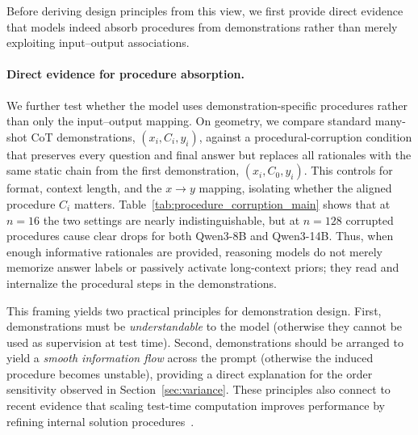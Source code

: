 \documentclass{llmxive}
\begin{document}
Before deriving design principles from this view, we first provide direct evidence that models indeed absorb procedures from demonstrations rather than merely exploiting input--output associations.

\paragraph{Direct evidence for procedure absorption.}
We further test whether the model uses demonstration-specific procedures rather than only the input--output mapping.
On geometry, we compare standard many-shot CoT demonstrations, $(x_i,C_i,y_i)$, against a procedural-corruption condition that preserves every question and final answer but replaces all rationales with the same static chain from the first demonstration, $(x_i,C_0,y_i)$.
This controls for format, context length, and the $x\rightarrow y$ mapping, isolating whether the aligned procedure $C_i$ matters.
Table~\ref{tab:procedure_corruption_main} shows that at $n=16$ the two settings are nearly indistinguishable, but at $n=128$ corrupted procedures cause clear drops for both Qwen3-8B and Qwen3-14B.
Thus, when enough informative rationales are provided, reasoning models do not merely memorize answer labels or passively activate long-context priors; they read and internalize the procedural steps in the demonstrations.

\begin{table}[t]
\centering
{}
\caption{Procedural-corruption ablation on geometry. The larger drop at $n=128$ indicates that models use demonstration-specific procedures, not only answer labels or long-context activation.}
\label{tab:procedure_corruption_main}
\vspace{-8mm}
\end{table}

This framing yields two practical principles for demonstration design.
First, demonstrations must be \emph{understandable} to the model (otherwise they cannot be used as supervision at test time).
Second, demonstrations should be arranged to yield a \emph{smooth information flow} across the prompt (otherwise the induced procedure becomes unstable), providing a direct explanation for the order sensitivity observed in Section~\ref{sec:variance}.
These principles also connect to recent evidence that scaling test-time computation improves performance by refining internal solution procedures~\cite{snell2024scaling}.
\end{document}
